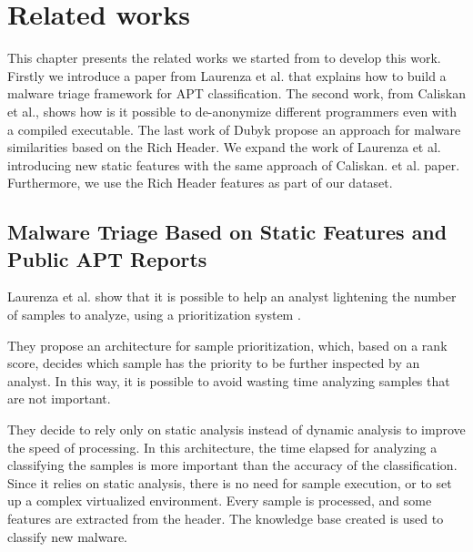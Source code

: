\chapter{Related works}
\label{ch:rel-works}

This chapter presents the related works we started from to develop this work. Firstly we introduce a paper from Laurenza et al. that explains how to build a malware triage framework for APT classification. The second work, from Caliskan et al., shows how is it possible to de-anonymize different programmers even with a compiled executable. The last work of Dubyk propose an approach for malware similarities based on the Rich Header. We expand the work of Laurenza et al. introducing new static features with the same approach of Caliskan. et al. paper. Furthermore, we use the Rich Header features as part of our dataset.  

\section{Malware Triage Based on Static Features and Public APT Reports}
Laurenza et al. show that it is possible to help an analyst lightening the number of samples to analyze, using a prioritization system \cite{laurenza2017malware}. 

They propose an architecture for sample prioritization, which, based on a rank score, decides which sample has the priority to be further inspected by an analyst. In this way, it is possible to avoid wasting time analyzing samples that are not important. 

They decide to rely only on static analysis instead of dynamic analysis to improve the speed of processing. In this architecture, the time elapsed for analyzing a classifying the samples is more important than the accuracy of the classification. Since it relies on static analysis, there is no need for sample execution, or to set up a complex virtualized environment. Every sample is processed, and some features are extracted from the header. The knowledge base created is used to classify new malware.

